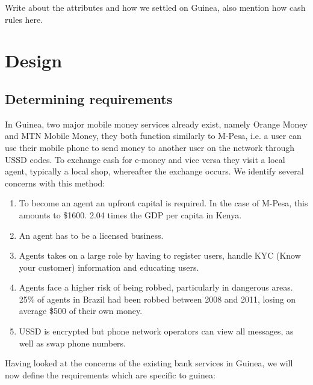 \documentclass[11pt, a4paper]{article}
\begin{document}
{\color{red} Write about the attributes and how we settled on Guinea, also mention how cash rules here.}





\section{Design}
\subsection{Determining requirements}
In Guinea, two major mobile money services already exist, namely Orange Money and MTN Mobile Money, they both function similarly to M-Pesa, i.e. a user can use their mobile phone to send money to another user on the network through USSD codes. To exchange cash for e-money and vice versa they visit a local agent, typically a local shop, whereafter the exchange occurs. We identify several concerns with this method:

\begin{enumerate}
  \item To become an agent an upfront capital is required. In the case of M-Pesa, this amounts to \$1600\cite{cgapreq}. 2.04 times the GDP per capita in Kenya\cite{cgapreq}.
  \item An agent has to be a licensed business\cite{cgapreq}.
  \item Agents takes on a large role by having to register users, handle KYC (Know your customer) information and educating users.
  \item Agents face a higher risk of being robbed, particularly in dangerous areas. 25\% of agents in Brazil had been robbed between 2008 and 2011, losing on average \$500 of their own money\cite{cgapreq}.
  \item USSD is encrypted but phone network operators can view all messages, as well as swap phone numbers.\\
\end{enumerate}

Having looked at the concerns of the existing bank services in Guinea, we will now define the requirements which are specific to guinea:
\end{document}
